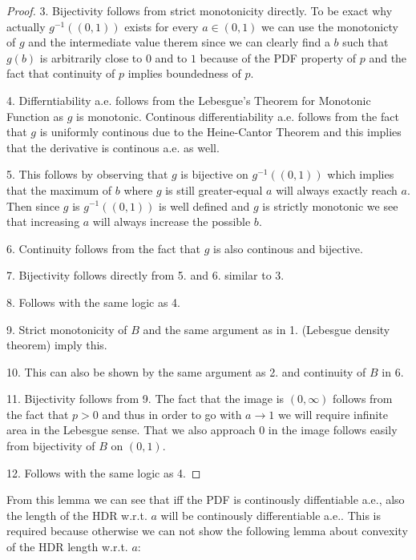 \begin{proof}
    3. Bijectivity follows from strict monotonicity directly. To be exact why actually $g^{-1}((0,1))$ exists for every $a \in (0,1)$ we can use the monotonicty of $g$ and the intermediate value therem since we can clearly find a $b$ such that $g(b)$ is arbitrarily close to $0$ and to $1$ because of the PDF property of $p$ and the fact that continuity of $p$ implies boundedness of $p$.

    4. Differntiability a.e. follows from the Lebesgue's Theorem for Monotonic Function as $g$ is monotonic. Continous differentiability a.e. follows from the fact that $g$ is uniformly continous due to the Heine-Cantor Theorem and this implies that the derivative is continous a.e. as well. %

    5. This follows by observing that $g$ is bijective on $g^{-1}((0,1))$ which implies that the maximum of $b$ where $g$ is still greater-equal $a$ will always exactly reach $a$. Then since $g$ is $g^{-1}((0,1))$ is well defined and $g$ is strictly monotonic we see that increasing $a$ will always increase the possible $b$.
    
    6. Continuity follows from the fact that $g$ is also continous and bijective.
    
    7. Bijectivity follows directly from 5. and 6. similar to 3.

    8. Follows with the same logic as 4.

    9. Strict monotonicity of $B$ and the same argument as in 1. (Lebesgue density theorem) imply this.

    10. This can also be shown by the same argument as 2. and continuity of $B$ in 6.

    11. Bijectivity follows from 9. The fact that the image is $(0,\infty)$ follows from the fact that $p>0$ and thus in order to go with $a \to 1$ we will require infinite area in the Lebesgue sense. That we also approach $0$ in the image follows easily from bijectivity of $B$ on $(0,1)$.

    12. Follows with the same logic as 4.
\end{proof}


From this lemma we can see that iff the PDF is continously diffentiable a.e., also the length of the HDR w.r.t. $a$ will be continously differentiable a.e.. This is required because otherwise we can not show the following lemma about convexity of the HDR length w.r.t. $a$:

